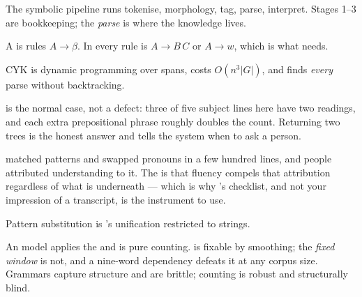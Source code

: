 \begin{chaptersummary}
\begin{tight}
  \item The symbolic pipeline runs tokenise, morphology, tag, parse, interpret.
        Stages 1--3 are bookkeeping; the \emph{parse} is where the knowledge lives.
  \item A  is rules $A \to \beta$. In  every rule is $A \to B\,C$ or $A \to w$, which is what
         needs.
  \item CYK is dynamic programming over spans, costs $O(n^{3}|G|)$, and finds
        \emph{every} parse without backtracking.
  \item {} is the normal case, not a defect: three of five subject
        lines here have two readings, and each extra prepositional phrase roughly
        doubles the count. Returning two trees is the honest answer and tells the
        system when to ask a person.
  \item {} matched patterns and swapped pronouns in a few hundred lines,
        and people attributed understanding to it. The  is that
        fluency compels that attribution regardless of what is underneath --- which
        is why 's checklist, and not your impression of a
        transcript, is the instrument to use.
  \item Pattern substitution is 's unification restricted to strings.
  \item An  model applies the  and is pure
        counting.  is fixable by smoothing; the \emph{fixed window}
        is not, and a nine-word dependency defeats it at any corpus size. Grammars
        capture structure and are brittle; counting is robust and structurally
        blind.
\end{tight}
\end{chaptersummary}

